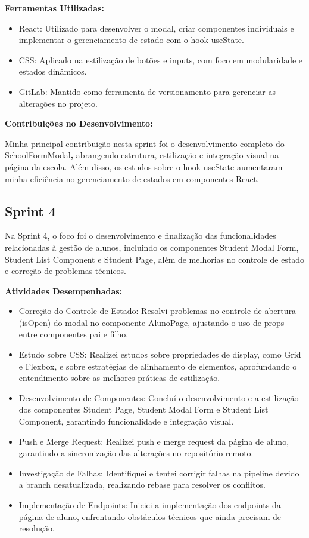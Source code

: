 \textbf{Ferramentas Utilizadas:}

\begin{itemize}
\item
  React: Utilizado para desenvolver o modal, criar componentes
  individuais e implementar o gerenciamento de estado com o hook
  useState.
\item
  CSS: Aplicado na estilização de botões e inputs, com foco em
  modularidade e estados dinâmicos.
\item
  GitLab: Mantido como ferramenta de versionamento para gerenciar as
  alterações no projeto.
\end{itemize}

\textbf{Contribuições no Desenvolvimento:}

Minha principal contribuição nesta sprint foi o desenvolvimento completo
do SchoolFormModal\textbf{,} abrangendo estrutura, estilização e
integração visual na página da escola. Além disso, os estudos sobre o
hook useState aumentaram minha eficiência no gerenciamento de estados em
componentes React.

\subsection{Sprint 4}

Na Sprint 4, o foco foi o desenvolvimento e finalização das
funcionalidades relacionadas à gestão de alunos, incluindo os
componentes Student Modal Form, Student List Component e Student Page,
além de melhorias no controle de estado e correção de problemas
técnicos.

\textbf{Atividades Desempenhadas:}

\begin{itemize}
\item
  Correção do Controle de Estado: Resolvi problemas no controle de
  abertura (isOpen) do modal no componente AlunoPage, ajustando o uso de
  props entre componentes pai e filho.
\item
  Estudo sobre CSS: Realizei estudos sobre propriedades de display, como Grid e
  Flexbox, e sobre estratégias de alinhamento de elementos, aprofundando o
  entendimento sobre as melhores práticas de estilização.
\item
  Desenvolvimento de Componentes: Concluí o desenvolvimento e a
  estilização dos componentes Student Page, Student Modal Form e Student
  List Component, garantindo funcionalidade e integração visual.
\item
  Push e Merge Request: Realizei push e merge request da página de
  aluno, garantindo a sincronização das alterações no repositório
  remoto.
\item
  Investigação de Falhas: Identifiquei e tentei corrigir falhas na
  pipeline devido a branch desatualizada, realizando rebase para
  resolver os conflitos.
\item
  Implementação de Endpoints: Iniciei a implementação dos endpoints da
  página de aluno, enfrentando obstáculos técnicos que ainda precisam de
  resolução.
\end{itemize}

